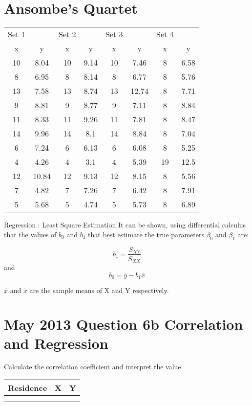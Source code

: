 \documentclass[]{report}
\begin{document}
\section*{Ansombe's Quartet}
\begin{tabular}{||c|c||c|c||c|c||c|c||}
	\hline
	Set 1 	&		&	Set 2	&		&	Set 3	&		&	Set 4	&		\\
	x	&	y	&	x	&	y	&	x	&	y	&	x	&	y	\\
	10	&	8.04	&	10	&	9.14	&	10	&	7.46	&	8	&	6.58	\\
	8	&	6.95	&	8	&	8.14	&	8	&	6.77	&	8	&	5.76	\\
	13	&	7.58	&	13	&	8.74	&	13	&	12.74	&	8	&	7.71	\\
	9	&	8.81	&	9	&	8.77	&	9	&	7.11	&	8	&	8.84	\\
	11	&	8.33	&	11	&	9.26	&	11	&	7.81	&	8	&	8.47	\\
	14	&	9.96	&	14	&	8.1	&	14	&	8.84	&	8	&	7.04	\\
	6	&	7.24	&	6	&	6.13	&	6	&	6.08	&	8	&	5.25	\\
	4	&	4.26	&	4	&	3.1	&	4	&	5.39	&	19	&	12.5	\\
	12	&	10.84	&	12	&	9.13	&	12	&	8.15	&	8	&	5.56	\\
	7	&	4.82	&	7	&	7.26	&	7	&	6.42	&	8	&	7.91	\\
	5	&	5.68	&	5	&	4.74	&	5	&	5.73	&	8	&	6.89	\\
	\hline
\end{tabular}






{Regression : Least Square Estimation}
It can be shown, using differential calculus that the values of $b_0$
and $b_1$ that best estimate the true parameters $\beta_0$ and $\beta_1$ are:

\[ b_1 = \frac{S_{XY}}{S_{XX}}\]
and
\[ b_0 = \bar{y} - b_1 \bar{x} \]

$\bar{x}$ and $\bar{x}$ are the sample means of X and Y respectively.


			\section*{May 2013 Question 6b Correlation and Regression }
			Calculate the correlation coefficient and interpret the value.
			\begin{tabular}{|c|c|c|}
				\hline Residence	& X	  & Y \\ 
				\hline  &  &  \\ 
				\hline  &  &  \\ 
				\hline 
			\end{tabular} 
			
\end{document}
